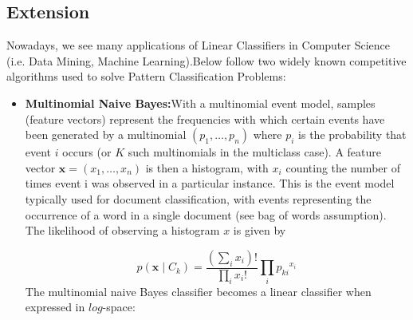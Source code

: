 \documentclass[12pt]{article}
\begin{document}
{\subsection*{Extension}
\par  Nowadays, we see many applications of Linear Classifiers in Computer Science (i.e. Data Mining, Machine Learning).Below follow two widely known competitive algorithms used to solve Pattern Classification Problems:
\begin{itemize}
    \item \textbf{Multinomial Naive Bayes:}With a multinomial event model, samples (feature vectors) represent the frequencies with which certain events have been generated by a multinomial $(p_1, \dots, p_n)$ where $p_{i}$ is the probability that event $i$ occurs (or $K$ such multinomials in the multiclass case). A feature vector ${\mathbf  {x}}=(x_{1},\dots ,x_{n})$ is then a histogram, with $x_{i}$ counting the number of times event i was observed in a particular instance. This is the event model typically used for document classification, with events representing the occurrence of a word in a single document (see bag of words assumption). The likelihood of observing a histogram $x$ is given by

$$ p(\mathbf {x} \mid C_{k})={\frac {(\sum _{i}x_{i})!}{\prod _{i}x_{i}!}}\prod _{i}{p_{ki}}^{x_{i}}$$
The multinomial naive Bayes classifier becomes a linear classifier when expressed in $log$-space:


\end{itemize}}
\end{document}

